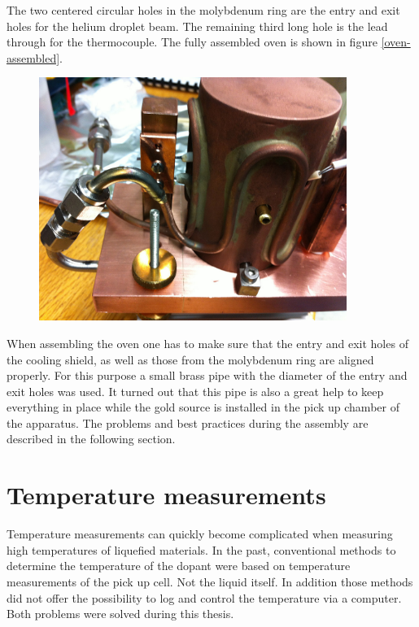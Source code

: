 \documentclass[parskip,12pt,headsepline,a4paper] {scrbook}
\begin{document}
The two centered circular holes in the molybdenum ring are the entry and exit holes for the helium droplet beam. The remaining third long hole is the lead through for the thermocouple. The fully assembled oven is shown in figure \ref{oven-assembled}.

\begin{figure}[ht]
\centerline{
\includegraphics[width=10cm]{./oven/FullyAssembled.jpg}}
\end{figure}


When assembling the oven one has to make sure that the entry and exit holes of the cooling shield, as well as those from the molybdenum ring are aligned properly. For this purpose a small brass pipe with the diameter of the entry and exit holes was used. It turned out that this pipe is also a great help to keep everything in place while the gold source is installed in the pick up chamber of the apparatus. The problems and best practices during the assembly are described in the following section.

\section{Temperature measurements}
\vspace{-1\baselineskip}
Temperature measurements can quickly become complicated when measuring high temperatures of liquefied materials. In the past, conventional methods to determine the temperature of the dopant were based on temperature measurements of the pick up cell. Not the liquid itself. In addition those methods did not offer the possibility to log and control the temperature via a computer. Both problems were solved during this thesis. \\
\end{document}
